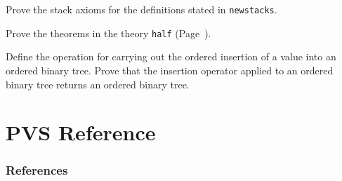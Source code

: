 \documentclass[11pt,part]{article}
\begin{document}
\begin{prob}
  Prove the stack axioms for the definitions stated in {\tt newstacks}.
\end{prob}

\begin{prob}
  Prove the theorems in the theory {\tt half} (Page~\pageref{half}).
\end{prob}

\begin{prob}
  Define the operation for carrying out the ordered insertion of a value
into an ordered binary tree.  Prove that the insertion operator applied
to an ordered binary tree returns an ordered binary tree.
\end{prob}

\setcounter{section}{0}
\part{PVS Reference}
\cleardoublepage
\newcommand{\wiftnewpage}{\newpage}
\newcommand{\refnewpage}{}


\newpage
\def\UrlFont{\tt}
\section*{References}


\end{document}
